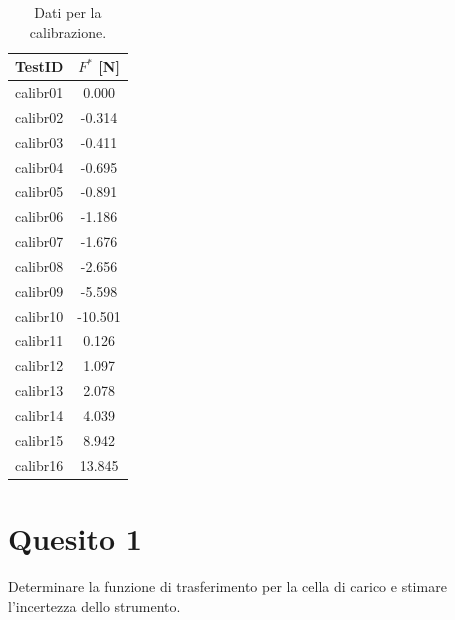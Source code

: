 \begin{table}[H]
    \centering
    \begin{tabular}{|l|c|}
        \toprule
        TestID & $F^*$ [N]  \\
        \midrule
        calibr01 & 0.000    \\
        calibr02 & -0.314   \\
        calibr03 & -0.411   \\
        calibr04 & -0.695   \\
        calibr05 & -0.891   \\
        calibr06 & -1.186   \\
        calibr07 & -1.676  \\
        calibr08 & -2.656   \\
        calibr09 & -5.598   \\
        calibr10 & -10.501  \\
        calibr11 & 0.126    \\
        calibr12 & 1.097    \\
        calibr13 & 2.078    \\
        calibr14 & 4.039   \\
        calibr15 & 8.942   \\
        calibr16 & 13.845  \\
        \bottomrule
    \end{tabular}
    \caption{Dati per la calibrazione.}
    \label{tab:tab-ref}
\end{table}

\section*{Quesito 1}

Determinare la funzione di trasferimento per la cella di carico e stimare l'incertezza dello strumento.

